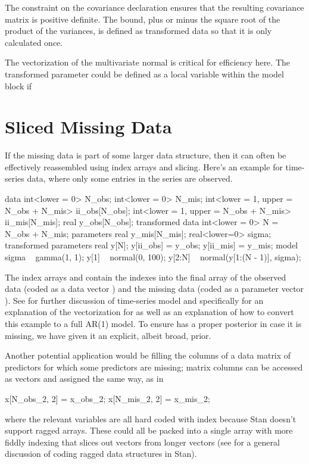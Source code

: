 The constraint on the covariance declaration ensures that the
resulting covariance matrix  is positive definite.  The
bound, plus or minus the square root of the product of the variances,
is defined as transformed data so that it is only calculated once.

The vectorization of the multivariate normal is critical for
efficiency here.  The transformed parameter  could be
defined as a local variable within the model block if

\section{Sliced Missing Data}

If the missing data is part of some larger data structure, then it can
often be effectively reassembled using index arrays and slicing.
Here's an example for time-series data, where only some entries in the
series are observed.
%
\begin{stancode}
data {
  int<lower = 0> N_obs;
  int<lower = 0> N_mis;
  int<lower = 1, upper = N_obs + N_mis> ii_obs[N_obs];
  int<lower = 1, upper = N_obs + N_mis> ii_mis[N_mis];
  real y_obs[N_obs];
}
transformed data {
  int<lower = 0> N = N_obs + N_mis;
}
parameters {
  real y_mis[N_mis];
  real<lower=0> sigma;
}
transformed parameters {
  real y[N];
  y[ii_obs] = y_obs;
  y[ii_mis] = y_mis;
}
model {
  sigma ~ gamma(1, 1);
  y[1] ~ normal(0, 100);
  y[2:N] ~ normal(y[1:(N - 1)], sigma);
}
\end{stancode}
%
The index arrays  and  contain the indexes
into the final array  of the observed data (coded as a data
vector ) and the missing data (coded as a parameter
vector ).  See  for further
discussion of time-series model and specifically
 for an explanation of the vectorization
for  as well as an explanation of how to convert this example
to a full AR(1) model.  To ensure  has a proper posterior
in case it is missing, we have given it an explicit, albeit broad,
prior.

Another potential application would be filling the
columns of a data matrix of predictors for which some predictors are
missing; matrix columns can be accessed as vectors and assigned the
same way, as in
%
\begin{stancode}
  x[N_obs_2, 2] = x_obs_2;
  x[N_mis_2, 2] = x_mis_2;
\end{stancode}
%
where the relevant variables are all hard coded with index 
because Stan doesn't support ragged arrays.  These could all be packed
into a single array with more fiddly indexing that slices out vectors
from longer vectors (see  for a
general discussion of coding ragged data structures in Stan).

